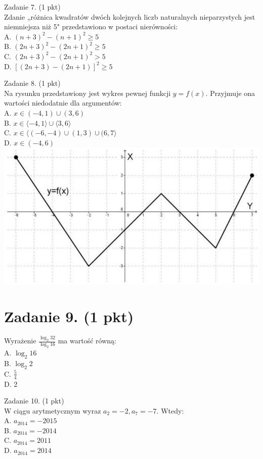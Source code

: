 \documentclass[10pt]{article}
\begin{document}
Zadanie 7. (1 pkt)\\
Zdanie „różnica kwadratów dwóch kolejnych liczb naturalnych nieparzystych jest niemniejsza niż 5" przedstawiono w postaci nierówności:\\
A. \((n+3)^{2}-(n+1)^{2} \geq 5\)\\
B. \((2 n+3)^{2}-(2 n+1)^{2} \geq 5\)\\
C. \((2 n+3)^{2}-(2 n+1)^{2}>5\)\\
D. \([(2 n+3)-(2 n+1)]^{2} \geq 5\)

Zadanie 8. (1 pkt)\\
Na rysunku przedstawiony jest wykres pewnej funkcji \(y=f(x)\). Przyjmuje ona wartości niedodatnie dla argumentów:\\
A. \(x \in(-4,1) \cup(3,6)\)\\
B. \(x \in\langle-4,1\rangle \cup\langle 3,6\rangle\)\\
C. \(x \in\langle(-6,-4) \cup(1,3) \cup(6,7\rangle\)\\
D. \(x \in(-4,6)\)\\
\includegraphics[max width=\textwidth, center]{2024_11_21_b31e6de468170710de69g-04}

\section*{Zadanie 9. (1 pkt)}
Wyrażenie \(\frac{\log _{2} 32}{\log _{2} 16}\) ma wartość równą:\\
A. \(\log _{2} 16\)\\
B. \(\log _{2} 2\)\\
C. \(\frac{5}{4}\)\\
D. 2

Zadanie 10. (1 pkt)\\
W ciągu arytmetycznym wyraz \(a_{2}=-2, a_{7}=-7\). Wtedy:\\
A. \(a_{2014}=-2015\)\\
B. \(a_{2014}=-2014\)\\
C. \(a_{2014}=2011\)\\
D. \(a_{2014}=2014\)
\end{document}
